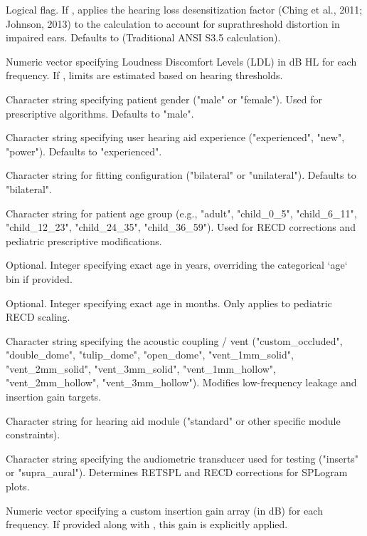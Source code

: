 \documentclass[letterpaper]{book}
\begin{document}
\begin{Arguments}
\begin{ldescription}
\item[\code{desensitization}] Logical flag. If , applies the hearing loss desensitization factor (Ching et al., 2011; Johnson, 2013) to the calculation to account for suprathreshold distortion in impaired ears. Defaults to  (Traditional ANSI S3.5 calculation).
\item[\code{ldl}] Numeric vector specifying Loudness Discomfort Levels (LDL) in dB HL for each frequency. If , limits are estimated based on hearing thresholds.
\item[\code{gender}] Character string specifying patient gender ("male" or "female"). Used for prescriptive algorithms. Defaults to "male".
\item[\code{experience}] Character string specifying user hearing aid experience ("experienced", "new", "power"). Defaults to "experienced".
\item[\code{config}] Character string for fitting configuration ("bilateral" or "unilateral"). Defaults to "bilateral".
\item[\code{age}] Character string for patient age group (e.g., "adult", "child\_0\_5", "child\_6\_11", "child\_12\_23", "child\_24\_35", "child\_36\_59"). Used for RECD corrections and pediatric prescriptive modifications.
\item[\code{age\_years}] Optional. Integer specifying exact age in years, overriding the categorical `age` bin if provided.
\item[\code{age\_months}] Optional. Integer specifying exact age in months. Only applies to pediatric RECD scaling.
\item[\code{coupling}] Character string specifying the acoustic coupling / vent ("custom\_occluded", "double\_dome", "tulip\_dome", "open\_dome", "vent\_1mm\_solid", "vent\_2mm\_solid", "vent\_3mm\_solid", "vent\_1mm\_hollow", "vent\_2mm\_hollow", "vent\_3mm\_hollow"). Modifies low-frequency leakage and insertion gain targets.
\item[\code{module}] Character string for hearing aid module ("standard" or other specific module constraints).
\item[\code{transducer}] Character string specifying the audiometric transducer used for testing ("inserts" or "supra\_aural"). Determines RETSPL and RECD corrections for SPLogram plots.
\item[\code{custom\_gain}] Numeric vector specifying a custom insertion gain array (in dB) for each frequency. If provided along with , this gain is explicitly applied.

\end{ldescription}
\end{Arguments}
\end{document}
